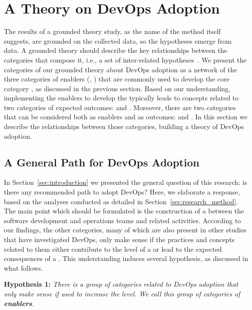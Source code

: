 \section{A Theory on DevOps Adoption} \label{sec:results}

The results of a grounded theory study, as the name of the method itself
suggests, are grounded on the collected data, so the hypotheses emerge from
data. A grounded theory should describe the key relationships between the
categories that compose it, i.e., a set of inter-related hypotheses~\cite{hoda2017becoming}.
We present the categories of our grounded theory
about DevOps adoption as a network of the three categories of enablers (,
) that are commonly used to develop the core category
\cc, as discussed in the previous section. Based on our understanding,
implementing the enablers to develop the \cc typically leads
to concepts related to two categories of expected outcomes:
 and . Moreover, there are two categories that can be considered
both as enablers and as outcomes:  and .
In this section we describe the relationships between those categories, building a theory
of DevOps adoption.

\subsection{A General Path for DevOps Adoption}

In Section~\ref{sec:introduction} we presented the general question of this
research: is there any recommended path to adopt DevOps? Here, we elaborate a response,
based on the analyses conducted as detailed in Section~\ref{sec:research_method}. The main
point which should be formulated is the construction of a  between the software development and operations teams and
related activities. According to our findings, the other categories,
many of which are also present in other studies that have investigated DevOps,
only make sense if the practices and
concepts related to them either contribute to the level of a \cc or lead to the expected consequences
of a \cc. This understanding induces several hypothesis, as discussed in
what follows.

\begin{mh}
\textbf{Hypothesis 1:} \textit{There is a group of categories related to DevOps adoption
that only make sense if used to increase the} \cc \emph{level. We
call this group of categories of \textbf{enablers}}.
\end{mh}

